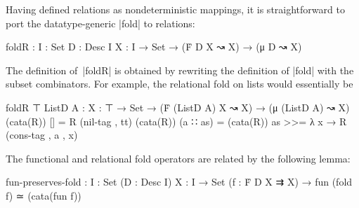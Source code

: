 Having defined relations as nondeterministic mappings, it is straightforward to port the datatype-generic |fold| to relations:
\begin{code}foldR :  {I : Set} {D : Desc I} {X : I → Set} →
         (Ḟ D X ↝ X) → (μ D ↝ X)
\end{code}The definition of~|foldR| is obtained by rewriting the definition of |fold| with the subset combinators.
For example, the relational fold on lists would essentially be
\begin{code}
foldR {⊤} {ListD A} :  {X : ⊤ → Set} →
                       (Ḟ  (ListD A) X  ↝ X) →
                       (μ  (ListD A)    ↝ X)
(cata(R)) []        =   R (nil-tag , tt)
(cata(R)) (a ∷ as)  =   (cata(R)) as >>= λ x → R (cons-tag , a , x)
\end{code}
The functional and relational fold operators are related by the following lemma:
\begin{code}fun-preserves-fold :
  {I : Set} (D : Desc I) {X : I → Set}
  (f : Ḟ D X ⇉ X) → fun (fold f) ≃ (cata(fun f))
\end{code}
